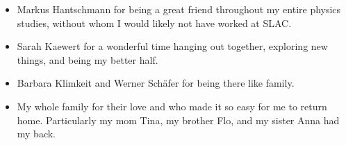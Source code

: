 \begin{itemize}
%
\item Markus Hantschmann for being a great friend throughout my entire physics studies, without whom I would likely not have worked at SLAC.
%
\item Sarah Kaewert for a wonderful time hanging out together, exploring new things, and being my better half.
%
\item Barbara Klimkeit and Werner Schäfer for being there like family.
%
\item My whole family for their love and who made it so easy for me to return home. Particularly my mom Tina, my brother Flo, and my sister Anna had my back.
%
\end{itemize}